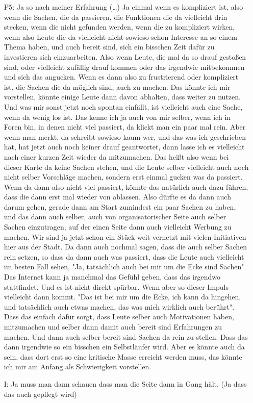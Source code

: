 \begin{itemize}
    \item[P5:] Ja so nach meiner Erfahrung (\dots) Ja einmal wenn es kompliziert ist, also wenn die Sachen, die da passieren, die Funktionen die da vielleicht drin stecken, wenn die nicht gefunden werden, wenn die zu kompliziert wirken, wenn also Leute die da vielleicht nicht sowieso schon Interesse an so einem Thema haben, und auch bereit sind, sich ein bisschen Zeit daf{\"u}r zu investieren sich einzuarbeiten. Also wenn Leute, die mal da so drauf gesto{\ss}en sind, oder vielleicht zuf{\"a}llig drauf kommen oder das irgendwie mitbekommen und sich das angucken. Wenn es dann also zu frustrierend oder kompliziert ist, die Sachen die da m{\"o}glich sind, auch zu machen. Das k{\"o}nnte ich mir vorstellen, k{\"o}nnte einige Leute dann davon abhalten, dass weiter zu nutzen. Und was mir sonst jetzt noch spontan einf{\"a}llt, ist vielleicht auch eine Sache, wenn da wenig los ist. Das kenne ich ja auch von mir selber, wenn ich in Foren bin, in denen nicht viel passiert, da klickt man ein paar mal rein. Aber wenn man merkt, da schreibt sowieso kaum wer, und das was ich geschrieben hat, hat jetzt auch noch keiner drauf geantwortet, dann lasse ich es vielleicht nach einer kurzen Zeit wieder da mitzumachen. Das hei{\ss}t also wenn bei dieser Karte da keine Sachen stehen, und die Leute selber vielleicht auch noch nicht selber Vorschl{\"a}ge machen, sondern erst einmal gucken was da passiert. Wenn da dann also nicht viel passiert, k{\"o}nnte das nat{\"u}rlich auch dazu f{\"u}hren, dass die dann erst mal wieder von ablassen. Also d{\"u}rfte es da dann auch darum gehen, gerade dann am Start zumindest ein paar Sachen zu haben, und das dann auch selber, auch von organisatorischer Seite auch selber Sachen einzutragen, auf der einen Seite dann auch vielleicht Werbung zu machen. Wir sind ja jetzt schon ein St{\"u}ck weit vernetzt mit vielen Initiativen hier aus der Stadt. Da dann auch nochmal sagen, dass die auch selber Sachen rein setzen, so dass da dann auch was passiert, dass die Leute auch vielleicht im besten Fall sehen, "Ja, tats{\"a}chlich auch bei mir um die Ecke sind Sachen". Das Internet kann ja manchmal das Gef{\"u}hl geben, dass das irgendwo stattfindet. Und es ist nicht direkt sp{\"u}rbar. Wenn aber so dieser Impuls vielleicht dann kommt. "Das ist bei mir um die Ecke, ich kann da hingehen, und tats{\"a}chlich auch etwas machen, das was mich wirklich auch ber{\"u}hrt". Dass das einfach daf{\"u}r sorgt, dass Leute selber auch Motivationen haben, mitzumachen und selber dann damit auch bereit sind Erfahrungen zu machen. Und dann auch selber bereit sind Sachen da rein zu stellen. Dass das dann irgendwie so ein bisschen ein Selbstl{\"a}ufer wird. Aber es k{\"o}nnte auch da sein, dass dort erst so eine kritische Masse erreicht werden muss, das k{\"o}nnte ich mir am Anfang als Schwierigkeit vorstellen.
    \item[I:] Ja muss man dann schauen dass man die Seite dann in Gang h{\"a}lt. (Ja dass das auch gepflegt wird)
\end{itemize}

